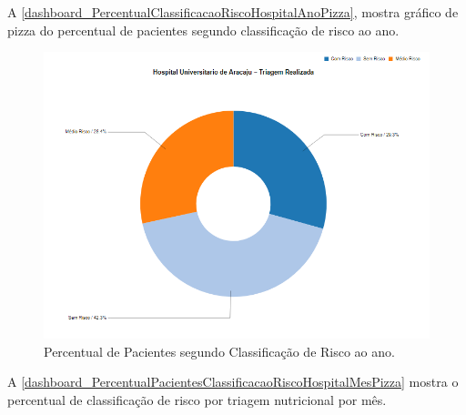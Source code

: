 \newpage
A \autoref{dashboard_PercentualClassificacaoRiscoHospitalAnoPizza}, mostra gráfico de pizza do percentual de pacientes segundo classificação de risco ao ano.

\begin{figure}[htb]
	\caption{\label{dashboard_PercentualClassificacaoRiscoHospitalAnoPizza}Percentual de Pacientes segundo Classificação de Risco ao ano.}
	\begin{center}
	    \includegraphics[scale=0.6]{Imagens/2.1.PercentualPacientesClassificacaoRiscoHospitalAnoPizza.png}
	\end{center}
\end{figure}

\clearpage
A \autoref{dashboard_PercentualPacientesClassificacaoRiscoHospitalMesPizza} mostra o percentual de classificação de risco por triagem nutricional por mês.

